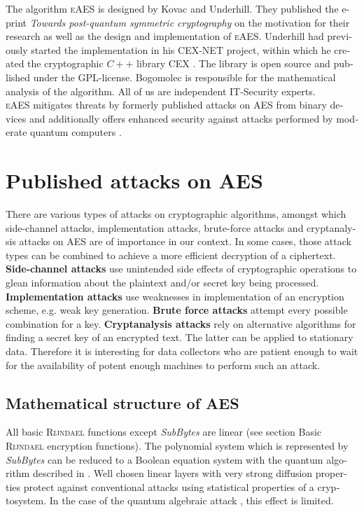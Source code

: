 \documentclass[a4paper,11pt]{article}
\begin{document}
\begin{otherlanguage}{english}
\vspace{0.3cm} 

\noindent
The algorithm \textsc{eAES} is designed by Kovac and Underhill. They published the e-print \textit{Towards post-quantum symmetric cryptography} \cite{KUN} on the motivation for their research as well as the design and implementation of \textsc{eAES}. Underhill had previously started the implementation in his CEX-NET project, within which he created the cryptographic $C++$ library CEX \cite{CEX}. The library is open source and published under the GPL-license. Bogomolec is responsible for the mathematical analysis of the algorithm. All of us are independent IT-Security experts.\\

\noindent
\textsc{eAES} mitigates threats by formerly published attacks on \textsc{AES} from binary devices \cite{HFE,WEI,CRK} and additionally offers enhanced security against attacks performed by moderate quantum computers \cite{GRO,QAA}. \\ 

\section{Published attacks on \textsc{AES}}

\noindent
There are various types of attacks on cryptographic algorithms, amongst which side-channel attacks, implementation attacks, brute-force attacks and cryptanalysis attacks on \textsc{AES} are of importance in our context. In some cases, those attack types can be combined to achieve a more efficient decryption of a ciphertext.\\

\noindent
\textbf{Side-channel attacks} use unintended side effects of cryptographic operations to glean information about the plaintext and/or secret key being processed. \textbf{Implementation attacks} use weaknesses in implementation of an encryption scheme, e.g. weak key generation. \textbf{Brute force attacks} attempt every possible combination for a key. \textbf{Cryptanalysis attacks} rely on alternative algorithms for finding a secret key of an encrypted text. The latter can be applied to stationary data. Therefore it is interesting for data collectors who are patient enough to wait for the availability of potent enough machines to perform such an attack.

\subsection{Mathematical structure of \textsc{AES}}
\noindent
All basic \textsc{Rijndael} functions except \textit{SubBytes} are linear (see section Basic \textsc{Rijndael} encryption functions). The polynomial system which is represented by \textit{SubBytes} can be reduced to a Boolean equation system with the quantum algorithm  described in \cite{QAA}. Well chosen linear layers with very strong diffusion properties protect against conventional attacks using statistical properties of a cryptosystem. In the case of the quantum algebraic attack \cite{QAA}, this effect is limited.


\end{otherlanguage}
\end{document}

